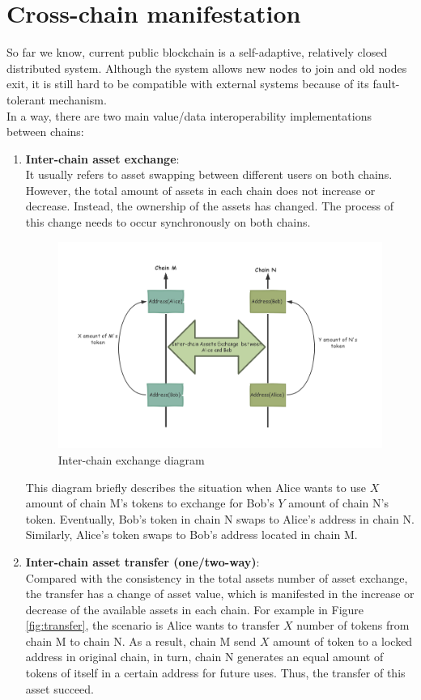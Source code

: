 \section{Cross-chain manifestation}
\label{sec:cm}
\noindent So far we know, current public blockchain is a self-adaptive, relatively closed distributed system. Although the system allows new nodes to join and old nodes exit, it is still hard to be compatible with external systems because of   its fault-tolerant mechanism. \\

\noindent In a way, there are two main value/data interoperability implementations between chains:
\begin{enumerate}
    \item \textbf{Inter-chain asset exchange}: \\
    It usually refers to asset swapping between different users on both chains. However, the total amount of assets in each chain does not increase or decrease. Instead, the ownership of the assets has changed. The process of this change needs to occur synchronously on both chains. \\
    \begin{figure}[H]
    \includegraphics[width=1\textwidth]{./figures/asset_swap.png}
    \centering
    \caption{Inter-chain exchange diagram}%
    \centering
    \label{fig:swap}
    \end{figure}
    
    This diagram briefly describes the situation when Alice wants to use $X$ amount of chain M's tokens to exchange for Bob's $Y$ amount of chain N's token. Eventually, Bob's token in chain N swaps to Alice's address in chain N. Similarly, Alice's token swaps to Bob's address located in chain M.
    \item \textbf{Inter-chain asset transfer (one/two-way)}: \\
    Compared with the consistency in the total assets number of asset exchange, the transfer has a change of asset value, which is manifested in the increase or decrease of the available assets in each chain. For example in Figure \ref{fig:transfer}, the scenario is Alice wants to transfer $X$ number of tokens from chain M to chain N. As a result, chain M send $X$ amount of token to a locked address in original chain, in turn, chain N generates an equal amount of tokens of itself in a certain address for future uses. Thus, the transfer of this asset succeed.


\end{enumerate}
